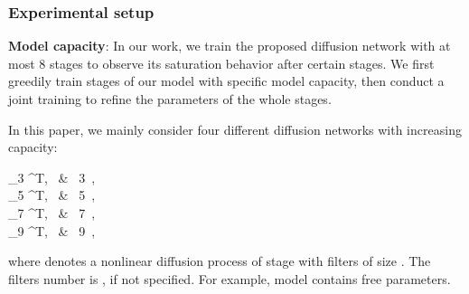 \documentclass[10pt,journal,compsoc]{IEEEtran}
\begin{document}
\subsubsection{Experimental setup}
\noindent \textbf{Model capacity}: 
In our work, we train the proposed diffusion network with at most 8 
stages to observe its saturation behavior after certain stages. 
We first greedily train  stages of our model with 
specific model capacity, then conduct a joint training to refine 
the parameters of the whole  stages. 

In this paper, we mainly consider four different diffusion networks with increasing capacity: 

        _{3 }^T, ~& ~3 \,,\\
        _{5 }^T, ~& ~5 \,,\\
        _{7 }^T, ~& ~7 \,, \\
  	 _{9 }^T, ~&  ~9 \,,

where  denotes a nonlinear diffusion process of 
stage  with filters of size . The filters number is , 
if not specified. {For example,  model contains 
 free parameters. }
\end{document}

